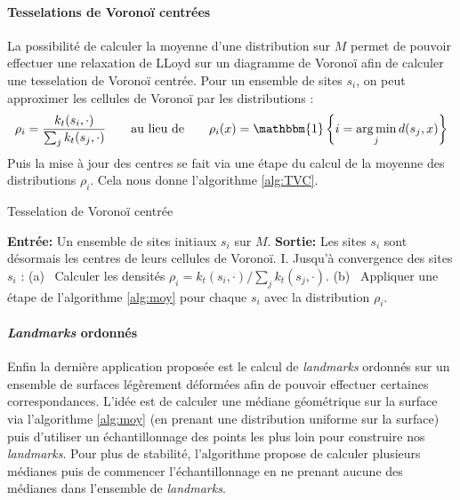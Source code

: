 \documentclass[11pt]{article}
\DeclareMathOperator*{\argmin}{arg\,min}
\begin{document}
	\paragraph{Tesselations de Voronoï centrées}
	La possibilité de calculer la moyenne d'une distribution sur $M$ permet de pouvoir effectuer une relaxation de LLoyd sur un diagramme de Voronoï afin de calculer une tesselation de Voronoï centrée. Pour un ensemble de sites $s_i$, on peut approximer les cellules de Voronoï par les distributions :
	$$ \rho_i = \frac{k_t(s_i, \cdot)}{\sum_j k_t(s_j, \cdot)} \qquad \text{au lieu de} \qquad \rho_i(x) = \mathbbm{1} \left\{ i = \argmin_j d(s_j, x) \right\} $$
	Puis la mise à jour des centres se fait via une étape du calcul de la moyenne des distributions $\rho_i$. Cela nous donne l'algorithme \ref{alg:TVC}.
	\begin{algorithm}[h]
		\caption{Tesselation de Voronoï centrée}
		\label{alg:TVC}
		\begin{algorithmic}
			\State \textbf{Entrée:} Un ensemble de sites initiaux $s_i$ sur $M$.
			\State \textbf{Sortie:} Les sites $s_i$ sont désormais les centres de leurs cellules de Voronoï.
			\State \hspace{7pt} I. \; Jusqu'à convergence des sites $s_i$ :
			\State \hspace{10pt} (a) \, Calculer les densités $\rho_i = k_t(s_i, \cdot) / \sum_j k_t(s_j, \cdot)$.
			\State \hspace{10pt} (b) \, Appliquer une étape de l'algorithme \ref{alg:moy} pour chaque $s_i$ avec la distribution $\rho_i$.
		\end{algorithmic}
	\end{algorithm}
	
	\paragraph{\textit{Landmarks} ordonnés}
	Enfin la dernière application proposée est le calcul de \textit{landmarks} ordonnés sur un ensemble de surfaces légèrement déformées afin de pouvoir effectuer certaines correspondances. L'idée est de calculer une médiane  géométrique sur la surface via l'algorithme \ref{alg:moy} (en prenant une distribution uniforme sur la surface) puis d'utiliser un échantillonnage des points les plus loin pour construire nos \textit{landmarks}. Pour plus de stabilité, l'algorithme propose de calculer plusieurs médianes puis de commencer l'échantillonnage en ne prenant aucune des médianes dans l'ensemble de \textit{landmarks}.
	
\end{document}
